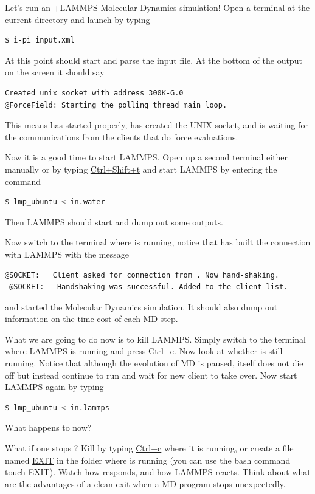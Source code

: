 \documentclass{article}
\begin{document}
\begin{Exercise}[label={i-pi},title={Molecular Dynamics: a client/server approach}]
\Question
Let's run an \ipi{}+LAMMPS Molecular Dynamics simulation!
Open a terminal at the current directory and
launch \ipi{} by typing
\begin{lstlisting}[language=bash]
$ i-pi input.xml
\end{lstlisting}
At this point \ipi{} should start 
and parse the input file. At the bottom of the output on the screen it should say
\begin{lstlisting}[language=bash]
Created unix socket with address 300K-G.0
@ForceField: Starting the polling thread main loop.
\end{lstlisting}
This means \ipi{} has started properly, has created the UNIX socket, and is waiting for the communications from the clients that do force evaluations.

\Question
Now it is a good time to start LAMMPS.
Open up a second terminal either manually or by typing \url{Ctrl+Shift+t}
and start LAMMPS by entering the command
\begin{lstlisting}[language=bash]
$ lmp_ubuntu < in.water
\end{lstlisting}
Then LAMMPS should start and dump out some outputs.

\Question
Now switch to the terminal where \ipi{} is running, notice that \ipi{} has built the connection with LAMMPS with the message
\begin{lstlisting}[language=sh]
 @SOCKET:   Client asked for connection from . Now hand-shaking.
 @SOCKET:   Handshaking was successful. Added to the client list.
\end{lstlisting}
and started the Molecular Dynamics simulation.
It should also dump out information on the time cost of each MD step.

\Question
What we are going to do now is to kill LAMMPS.
Simply switch to the terminal where LAMMPS is running and press \url{Ctrl+c}.
Now look at whether \ipi{} is still running.
Notice that although the evolution of MD is paused, \ipi{} itself does not die off but instead continue to run and wait for new client to take over.
Now start LAMMPS again by typing
\begin{lstlisting}[language=bash]
$ lmp_ubuntu < in.lammps
\end{lstlisting}
What happens to \ipi{} now?

\Question
What if one stops \ipi{}? 
Kill \ipi{} by typing \url{Ctrl+c} where it is running, or create a file named \url{EXIT} in the folder where \ipi{} is running
(you can use the bash command \url{touch EXIT}).
Watch how \ipi{} responds, and how LAMMPS reacts.
Think about what are the advantages of a clean exit when a MD program stops unexpectedly.


\end{Exercise}
\end{document}
